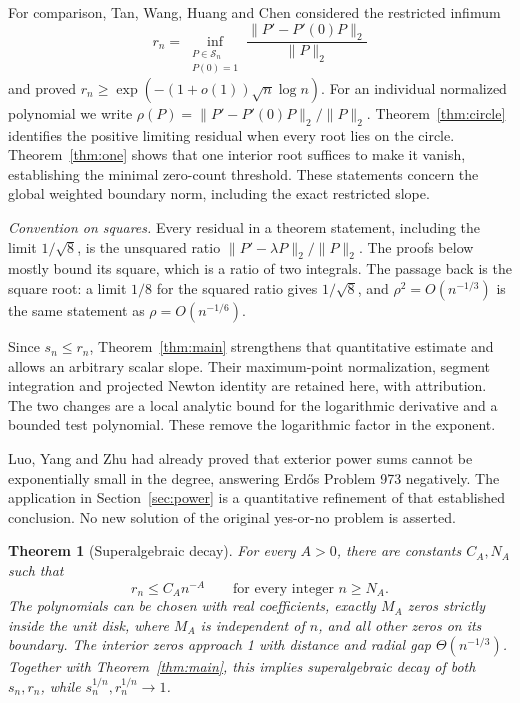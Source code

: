 \documentclass[11pt]{article}
\newtheorem{theorem}{Theorem}
\theoremstyle{remark}\newtheorem{remark}[theorem]{Remark}
\newcommand{\norm}[1]{\lVert #1\rVert}
\begin{document}
For comparison, Tan, Wang, Huang and Chen \cite[Theorem 1.1]{tan}
considered the restricted infimum
\[
 r_n=\inf_{\substack{P\in\mathcal S_n\\P(0)=1}}
       \frac{\norm{P'-P'(0)P}_2}{\norm P_2}
\]
and proved \(r_n\ge\exp(-(1+o(1))\sqrt n\log n)\).
For an individual normalized polynomial we write
\(\rho(P)=\norm{P'-P'(0)P}_2/\norm P_2\).
Theorem~\ref{thm:circle} identifies the positive limiting residual
when every root lies on the circle. Theorem~\ref{thm:one} shows
that one interior root suffices to make it vanish, establishing the
minimal zero-count threshold. These statements
concern the global weighted boundary norm, including the exact
restricted slope.

\emph{Convention on squares.} Every residual in a theorem statement,
including the limit \(1/\sqrt8\), is the unsquared ratio
\(\norm{P'-\lambda P}_2/\norm P_2\). The proofs below mostly bound its
square, which is a ratio of two integrals. The passage back is the
square root: a limit \(1/8\) for the squared ratio gives \(1/\sqrt8\),
and \(\rho^2=O(n^{-1/3})\) is the same statement as
\(\rho=O(n^{-1/6})\).

Since \(s_n\le r_n\), Theorem~\ref{thm:main} strengthens that quantitative
estimate and allows an arbitrary scalar slope.
Their maximum-point normalization, segment integration and projected
Newton identity are retained here, with attribution. The two changes
are a local analytic bound for the logarithmic derivative and a bounded
test polynomial. These remove the logarithmic factor in the exponent.

Luo, Yang and Zhu \cite[Theorem 1.1]{luo} had already proved that exterior
power sums cannot be exponentially small in the degree, answering
Erd\H{o}s Problem 973 negatively. The application in Section~\ref{sec:power}
is a quantitative refinement of that established conclusion.
No new solution of the original yes-or-no problem is asserted.

\begin{theorem}[Superalgebraic decay]\label{thm:upper}
For every \(A>0\), there are constants \(C_A,N_A\) such that
\[
 r_n\le C_A n^{-A}\qquad\text{for every integer }n\ge N_A.
\]
The polynomials can be chosen with real coefficients, exactly
\(M_A\) zeros strictly inside the unit disk, where \(M_A\) is
independent of \(n\), and all other zeros on its boundary.
The interior zeros approach 1 with distance and radial gap
\(\Theta(n^{-1/3})\). Together with
Theorem~\ref{thm:main}, this implies superalgebraic decay of both
\(s_n,r_n\), while \(s_n^{1/n},r_n^{1/n}\to1\).
\end{theorem}
\end{document}
